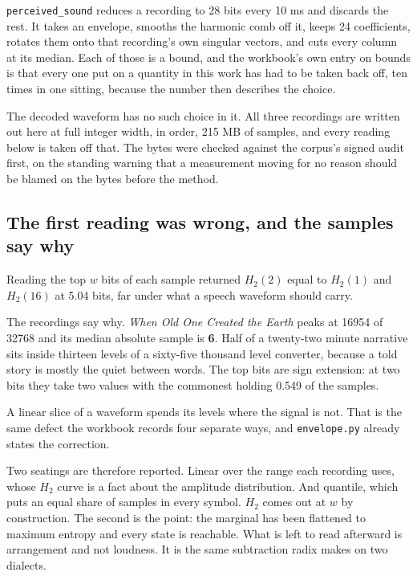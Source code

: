\texttt{perceived\_\allowbreak{}sound} reduces a recording to 28 bits every 10 ms and discards the
rest. It takes an envelope, smooths the harmonic comb off it, keeps 24 coefficients, rotates them
onto that recording's own singular vectors, and cuts every column at its median. Each of those is a
bound, and the workbook's own entry on bounds is that every one put on a quantity in this work has had
to be taken back off, ten times in one sitting, because the number then describes the choice.

The decoded waveform has no such choice in it. All three recordings are written out here at full
integer width, in order, 215 MB of samples, and every reading below is taken off that. The bytes were
checked against the corpus's signed audit first, on the standing warning that a measurement moving
for no reason should be blamed on the bytes before the method.

\subsection{The first reading was wrong, and the samples say why}

Reading the top \(w\) bits of each sample returned \(H_2(2)\) equal to \(H_2(1)\) and \(H_2(16)\) at
5.04 bits, far under what a speech waveform should carry.

The recordings say why. \emph{When Old One Created the Earth} peaks at 16954 of 32768 and its median
absolute sample is \textbf{6}. Half of a twenty-two minute narrative sits inside thirteen levels of a
sixty-five thousand level converter, because a told story is mostly the quiet between words. The top
bits are sign extension: at two bits they take two values with the commonest holding 0.549 of the
samples.

A linear slice of a waveform spends its levels where the signal is not. That is the same defect the
workbook records four separate ways, and \texttt{envelope.\allowbreak{}py} already states the
correction.

Two seatings are therefore reported. Linear over the range each recording uses, whose \(H_2\) curve
is a fact about the amplitude distribution. And quantile, which puts an equal share of samples in
every symbol. \(H_2\) comes out at \(w\) by construction. The second is the point: the marginal
has been flattened to maximum entropy and every state is reachable. What is left to read
afterward is arrangement and not loudness. It is the same subtraction radix makes on two dialects.

